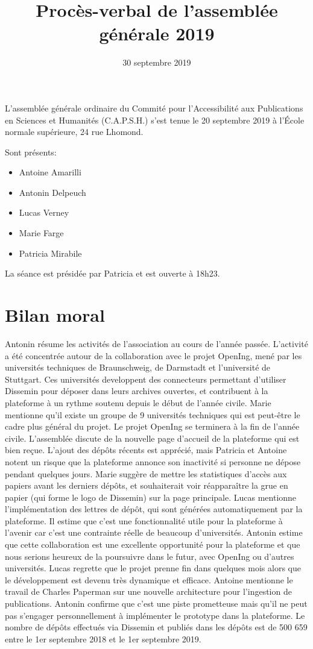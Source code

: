 \documentclass[a4paper]{article}
\title{Procès-verbal de l'assemblée générale 2019}
\date{30 septembre 2019}
\begin{document}
\maketitle

L'assemblée générale ordinaire du Commité pour l'Accessibilité aux Publications en Sciences et Humanités (C.A.P.S.H.) s'est tenue le 20 septembre 2019 à l'École normale supérieure, 24 rue Lhomond.

Sont présents:
\begin{itemize}
  \item Antoine Amarilli
  \item Antonin Delpeuch
  \item Lucas Verney
  \item Marie Farge
  \item Patricia Mirabile
\end{itemize}

La séance est présidée par Patricia et est ouverte à 18h23.

\section{Bilan moral}

Antonin résume les activités de l'association au cours de l'année passée.
L'activité a été concentrée autour de la collaboration avec le projet OpenIng, mené
par les universités techniques de Braunschweig, de Darmstadt et l'université de 
Stuttgart. Ces universités developpent des connecteurs permettant d'utiliser
Dissemin pour déposer dans leurs archives ouvertes, et contribuent à la plateforme
à un rythme soutenu depuis le début de l'année civile.
Marie mentionne qu'il existe un groupe de 9 universités techniques qui est peut-être
le cadre plus général du projet.
Le projet OpenIng se terminera à la fin de l'année civile.
L'assemblée discute de la nouvelle page d'accueil de la plateforme qui est bien reçue.
L'ajout des dépôts récents est apprécié, mais Patricia et Antoine notent un risque 
que la plateforme annonce son inactivité si personne ne dépose pendant quelques jours.
Marie suggère de mettre les statistiques d'accès aux papiers avant les derniers dépôts, et
souhaiterait voir réapparaître la grue en papier (qui forme le logo de Dissemin) sur 
la page principale.
Lucas mentionne l'implémentation des lettres de dépôt, qui sont générées automatiquement
 par la plateforme. Il estime que c'est une fonctionnalité utile pour la plateforme à l'avenir car c'est une contrainte réelle de beaucoup d'universités.
Antonin estime que cette collaboration est une excellente opportunité pour la plateforme
et que nous serions heureux de la poursuivre dans le futur, avec OpenIng ou d'autres universités. Lucas regrette que le projet prenne fin dans quelques mois alors que le développement est devenu très dynamique et efficace.
Antoine mentionne le travail de Charles Paperman sur une nouvelle architecture pour l'ingestion de publications. Antonin confirme que c'est une piste prometteuse mais qu'il ne peut pas s'engager personnellement à implémenter le prototype dans la
plateforme.
Le nombre de dépôts effectués via Dissemin et publiés dans les dépôts est
de 500 659 entre le 1er septembre 2018 et le 1er septembre 2019.
\end{document}
